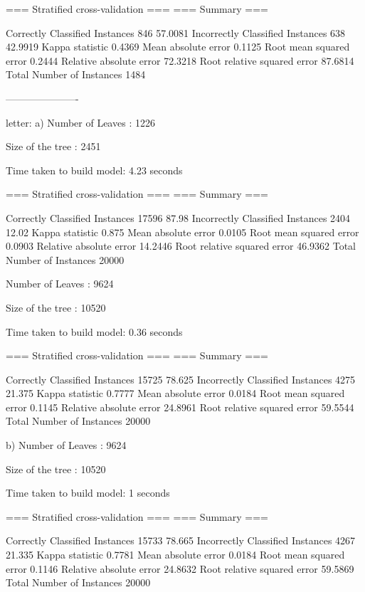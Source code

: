 === Stratified cross-validation ===
=== Summary ===

Correctly Classified Instances         846               57.0081 %
Incorrectly Classified Instances       638               42.9919 %
Kappa statistic                          0.4369
Mean absolute error                      0.1125
Root mean squared error                  0.2444
Relative absolute error                 72.3218 %
Root relative squared error             87.6814 %
Total Number of Instances             1484     





----------------------

letter:
a)
Number of Leaves  : 	1226

Size of the tree : 	2451


Time taken to build model: 4.23 seconds

=== Stratified cross-validation ===
=== Summary ===

Correctly Classified Instances       17596               87.98   %
Incorrectly Classified Instances      2404               12.02   %
Kappa statistic                          0.875 
Mean absolute error                      0.0105
Root mean squared error                  0.0903
Relative absolute error                 14.2446 %
Root relative squared error             46.9362 %
Total Number of Instances            20000     


Number of Leaves  : 	9624

Size of the tree : 	10520


Time taken to build model: 0.36 seconds

=== Stratified cross-validation ===
=== Summary ===

Correctly Classified Instances       15725               78.625  %
Incorrectly Classified Instances      4275               21.375  %
Kappa statistic                          0.7777
Mean absolute error                      0.0184
Root mean squared error                  0.1145
Relative absolute error                 24.8961 %
Root relative squared error             59.5544 %
Total Number of Instances            20000

b)
Number of Leaves  : 	9624

Size of the tree : 	10520


Time taken to build model: 1 seconds

=== Stratified cross-validation ===
=== Summary ===

Correctly Classified Instances       15733               78.665  %
Incorrectly Classified Instances      4267               21.335  %
Kappa statistic                          0.7781
Mean absolute error                      0.0184
Root mean squared error                  0.1146
Relative absolute error                 24.8632 %
Root relative squared error             59.5869 %
Total Number of Instances            20000


